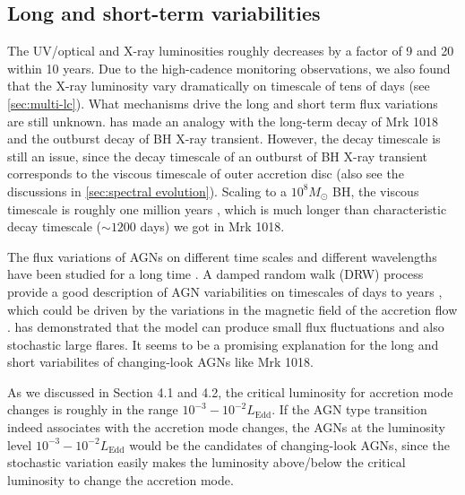 \documentclass[twocolumn]{aastex63}
\begin{document}


 





\subsection{Long and short-term variabilities}

The UV/optical and X-ray luminosities roughly decreases by a factor of 9 and 20 within 10 years. Due to the high-cadence monitoring observations, we also found that the X-ray luminosity vary dramatically on timescale of tens of days (see \autoref{sec:multi-lc}). What mechanisms drive the long and short term flux variations are still unknown. \citet{2018MNRAS.480.3898N} has made an analogy with the long-term decay of Mrk 1018 and the outburst decay of BH X-ray transient. However, the decay timescale is still an issue, since the decay timescale of an outburst of BH X-ray transient corresponds to the viscous timescale of outer accretion disc (also see the discussions in \autoref{sec:spectral evolution}). Scaling to a $10^{8}M_{\odot}$ BH, the viscous timescale is roughly one million years \citep{2012MmSAI..83..469L,2018MNRAS.475.1190Y}, which is much longer than characteristic decay timescale ($\sim 1200$ days) we got in Mrk 1018. 

The flux variations of AGNs on different time scales and different wavelengths have been studied for a long time \citep[see reviews in ][]{1997ARA&A..35..445U}. A damped random walk (DRW) process provide a good description of AGN variabilities on timescales of days to years \citep[e.g. ][]{2010ApJ...721.1014M,2011ApJ...730...52K}, which could be driven by the variations in the magnetic field of the accretion flow \citep{2004MNRAS.348..111K,2006MNRAS.368..379M,2007A&A...466..793J}. \citet{2004MNRAS.348..111K} has demonstrated that the model can produce small flux fluctuations and also stochastic large flares. It seems to be a promising explanation for the long and short variabilites of changing-look AGNs like Mrk 1018. 

As we discussed in Section 4.1 and 4.2, the critical luminosity for accretion mode changes is roughly in the range $10^{-3}-10^{-2}L_\mathrm{Edd}$\citep[see also ][]{2019arXiv191203972L}. If the AGN type transition indeed associates with the accretion mode changes, the AGNs at the luminosity level $10^{-3}-10^{-2}L_\mathrm{Edd}$ would be the candidates of changing-look AGNs, since the stochastic variation easily makes the luminosity above/below the critical luminosity to change the accretion mode. 
\end{document}

